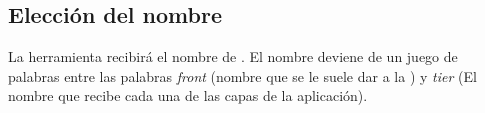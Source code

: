 \subsection{Elección del nombre}
\label{subsec:solution:naming}

La herramienta recibirá el nombre de \fronttier. El nombre deviene de un juego 
de palabras entre las palabras \emph{front} (nombre que se le suele dar a la 
\viewtier) y \emph{tier} (El nombre que recibe cada una de las capas de la 
aplicación).

